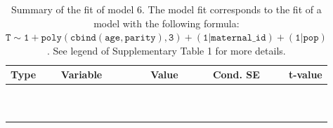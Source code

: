 \begin{table}[H]

\caption{\label{tab:tab6}Summary of the fit of model 6. The model fit corresponds to the fit of a model with the following formula: {\small$\mathtt{T \sim 1 + poly(cbind(age, parity), 3) + (1 | maternal\_id) + (1 | pop)}$}. See legend of Supplementary Table 1 for more details.}
\centering
\fontsize{8}{10}\selectfont
\begin{tabular}[t]{>{\raggedright\arraybackslash}p{3cm}>{\raggedright\arraybackslash}p{5cm}rrr}
\toprule
Type & Variable & Value & Cond. SE & t-value\\
\midrule
\cellcolor{gray!6}{fixed effects} & \cellcolor{gray!6}{$\beta_1$} & \cellcolor{gray!6}{-4.1} & \cellcolor{gray!6}{0.113} & \cellcolor{gray!6}{-36.4}\\
\cellcolor{gray!6}{} & \cellcolor{gray!6}{$\beta_{\mathtt{age}}$} & \cellcolor{gray!6}{73.7} & \cellcolor{gray!6}{31.1} & \cellcolor{gray!6}{2.37}\\
\cellcolor{gray!6}{} & \cellcolor{gray!6}{$\beta_{\mathtt{age}^2}$} & \cellcolor{gray!6}{-61.2} & \cellcolor{gray!6}{17.2} & \cellcolor{gray!6}{-3.55}\\
\cellcolor{gray!6}{} & \cellcolor{gray!6}{$\beta_{\mathtt{age}^3}$} & \cellcolor{gray!6}{-47.1} & \cellcolor{gray!6}{16.4} & \cellcolor{gray!6}{-2.87}\\
\cellcolor{gray!6}{} & \cellcolor{gray!6}{$\beta_{\mathtt{parity}}$} & \cellcolor{gray!6}{-0.936} & \cellcolor{gray!6}{40.1} & \cellcolor{gray!6}{-0.0233}\\
\cellcolor{gray!6}{} & \cellcolor{gray!6}{$\beta_{\mathtt{age}\times\mathtt{parity}}$} & \cellcolor{gray!6}{-4006} & \cellcolor{gray!6}{11890} & \cellcolor{gray!6}{-0.337}\\
\cellcolor{gray!6}{} & \cellcolor{gray!6}{$\beta_{\mathtt{age}^2\times\mathtt{parity}}$} & \cellcolor{gray!6}{7710} & \cellcolor{gray!6}{8669} & \cellcolor{gray!6}{0.889}\\
\cellcolor{gray!6}{} & \cellcolor{gray!6}{$\beta_{\mathtt{parity}^2}$} & \cellcolor{gray!6}{19} & \cellcolor{gray!6}{27.3} & \cellcolor{gray!6}{0.694}\\
\cellcolor{gray!6}{} & \cellcolor{gray!6}{$\beta_{\mathtt{age}\times\mathtt{parity}^2}$} & \cellcolor{gray!6}{-4380} & \cellcolor{gray!6}{8121} & \cellcolor{gray!6}{-0.539}\\
\cellcolor{gray!6}{} & \cellcolor{gray!6}{$\beta_{\mathtt{parity}^3}$} & \cellcolor{gray!6}{-18.6} & \cellcolor{gray!6}{14.1} & \cellcolor{gray!6}{-1.32}\\

\end{tabular}
\end{table}
